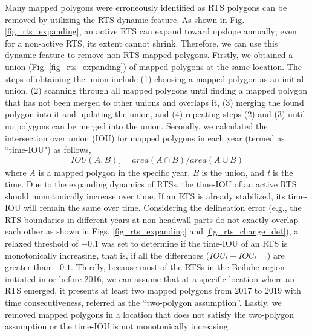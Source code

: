 \documentclass[authoryear,preprint,review,12pt]{elsarticle}
\begin{document}
Many mapped polygons were erroneously identified as RTS polygons can be removed by utilizing the RTS dynamic feature. 
As shown in Fig. \ref{fig_rts_expanding}, an active RTS can expand toward upslope annually; even for a non-active RTS, its extent cannot shrink. 
Therefore, we can use this dynamic feature to remove non-RTS mapped polygons. 
Firstly, we obtained a union (Fig. \ref{fig_rts_expanding}) of mapped polygons at the same location.
The steps of obtaining the union include (1) choosing a mapped polygon as an initial union, (2) scanning through all mapped polygons until finding a mapped polygon that has not been merged to other unions and overlaps it, (3) merging the found polygon into it and updating the union, and (4) repeating steps (2) and (3) until no polygons can be merged into the union. 
Secondly, we calculated the intersection over union (IOU) for mapped polygons in each year (termed as ``time-IOU") as follows, 
\begin{equation}
IOU(A,B)_{t}=area(A \cap B)/area(A \cup B)
\label{equ_time_iou}
\end{equation}
where \emph{A} is a mapped polygon in the specific year, \emph{B} is the union, and \emph{t} is the time. 
Due to the expanding dynamics of RTSs, the time-IOU of an active RTS should monotonically increase over time. 
If an RTS is already stabilized, its time-IOU will remain the same over time. 
Considering the delineation error (e.g., the RTS boundaries in different years at non-headwall parts do not exactly overlap each other as shown in Figs. \ref{fig_rts_expanding} and \ref{fig_rts_change_det}), a relaxed threshold of $-0.1$ was set to determine if the time-IOU of an RTS is monotonically increasing, that is, if all the differences ($IOU_{t}-IOU_{t-1}$) are greater than $-0.1$. %
Thirdly, because most of the RTSs in the Beiluhe region initiated in or before 2016,
we can assume that at a specific location where an RTS emerged, it presents at least two mapped polygons from 2017 to 2019 with time consecutiveness, referred as the ``two-polygon assumption''. 
Lastly, we removed mapped polygons in a location that does not satisfy the two-polygon assumption or the time-IOU is not monotonically increasing.
 
\end{document}
